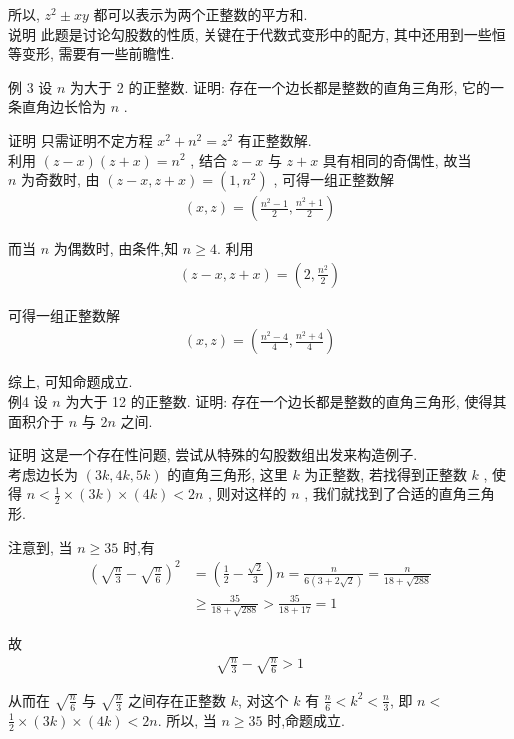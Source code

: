 所以,  $z^{2} \pm x y$ 都可以表示为两个正整数的平方和. \\
说明 此题是讨论勾股数的性质, 关键在于代数式变形中的配方, 其中还用到一些恒等变形, 需要有一些前瞻性.

例 3 设 $n$ 为大于 2 的正整数. 证明: 存在一个边长都是整数的直角三角形, 它的一条直角边长恰为 $n$ .

证明 只需证明不定方程 $x^{2}+n^{2}=z^{2}$ 有正整数解. \\
利用 $(z-x)(z+x)=n^{2}$ , 结合 $z-x$ 与 $z+x$ 具有相同的奇偶性, 故当\\
$n$ 为奇数时, 由 $(z-x, z+x)=\left(1, n^{2}\right)$ , 可得一组正整数解
\begin{align*}
	(x, z)=\left(\frac{n^{2}-1}{2}, \frac{n^{2}+1}{2}\right)
\end{align*}

而当 $n$ 为偶数时, 由条件,知 $n \geqslant 4$. 利用
\begin{align*}
	(z-x, z+x)=\left(2, \frac{n^{2}}{2}\right)
\end{align*}

可得一组正整数解
\begin{align*}
	(x, z)=\left(\frac{n^{2}-4}{4}, \frac{n^{2}+4}{4}\right)
\end{align*}

综上, 可知命题成立. \\
例4 设 $n$ 为大于 12 的正整数. 证明: 存在一个边长都是整数的直角三角形, 使得其面积介于 $n$ 与 $2 n$ 之间.

证明 这是一个存在性问题, 尝试从特殊的勾股数组出发来构造例子. \\
考虑边长为 $(3 k, 4 k, 5 k)$ 的直角三角形, 这里 $k$ 为正整数, 若找得到正整数 $k$ , 使得 $n<\frac{1}{2} \times(3 k) \times(4 k)<2 n$ , 则对这样的 $n$ , 我们就找到了合适的直角三角形.

注意到, 当 $n \geqslant 35$ 时,有\begin{align}
	\left(\sqrt{\frac{n}{3}}-\sqrt{\frac{n}{6}}\right)^{2} & =\left(\frac{1}{2}-\frac{\sqrt{2}}{3}\right) n=\frac{n}{6(3+2 \sqrt{2})}=\frac{n}{18+\sqrt{288}} \\
	                                                       & \geqslant \frac{35}{18+\sqrt{288}}>\frac{35}{18+17}=1
\end{align}

故
\begin{align*}
	\sqrt{\frac{n}{3}}-\sqrt{\frac{n}{6}}>1
\end{align*}

从而在 $\sqrt{\frac{n}{6}}$ 与 $\sqrt{\frac{n}{3}}$ 之间存在正整数 $k$, 对这个 $k$ 有 $\frac{n}{6}<k^{2}<\frac{n}{3}$, 即 $n<$ $\frac{1}{2} \times(3 k) \times(4 k)<2 n$. 所以, 当 $n \geqslant 35$ 时,命题成立.

